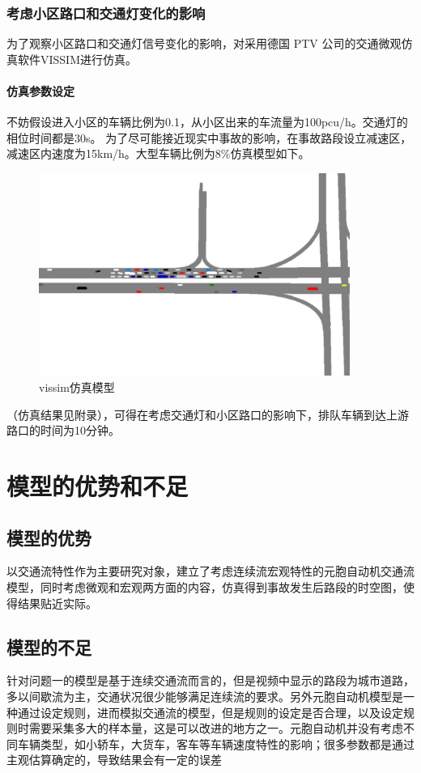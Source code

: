 \documentclass[UTF8,12.05pt]{ctexart}
\begin{document}
\subsubsection{考虑小区路口和交通灯变化的影响}
为了观察小区路口和交通灯信号变化的影响，对采用德国 PTV 公司的交通微观仿真软件VISSIM进行仿真。
\paragraph{仿真参数设定}
不妨假设进入小区的车辆比例为0.1，从小区出来的车流量为100pcu/h。交通灯的相位时间都是30s。
为了尽可能接近现实中事故的影响，在事故路段设立减速区，减速区内速度为15km/h。大型车辆比例为8$\%$仿真模型如下。
\begin{figure}[H]
  \centering
  \includegraphics[width=4.00in]{fangzhe.png}
  \caption{vissim仿真模型}
\end{figure}
（仿真结果见附录），可得在考虑交通灯和小区路口的影响下，排队车辆到达上游路口的时间为10分钟。
\section{模型的优势和不足}
\subsection{模型的优势}
以交通流特性作为主要研究对象，建立了考虑连续流宏观特性的元胞自动机交通流模型，同时考虑微观和宏观两方面的内容，仿真得到事故发生后路段的时空图，使得结果贴近实际。
\subsection{模型的不足}
针对问题一的模型是基于连续交通流而言的，但是视频中显示的路段为城市道路，多以间歇流为主，交通状况很少能够满足连续流的要求。另外元胞自动机模型是一种通过设定规则，进而模拟交通流的模型，但是规则的设定是否合理，以及设定规则时需要采集多大的样本量，这是可以改进的地方之一。元胞自动机并没有考虑不同车辆类型，如小轿车，大货车，客车等车辆速度特性的影响；很多参数都是通过主观估算确定的，导致结果会有一定的误差
\newpage

\newpage
\appendix
\end{document}
